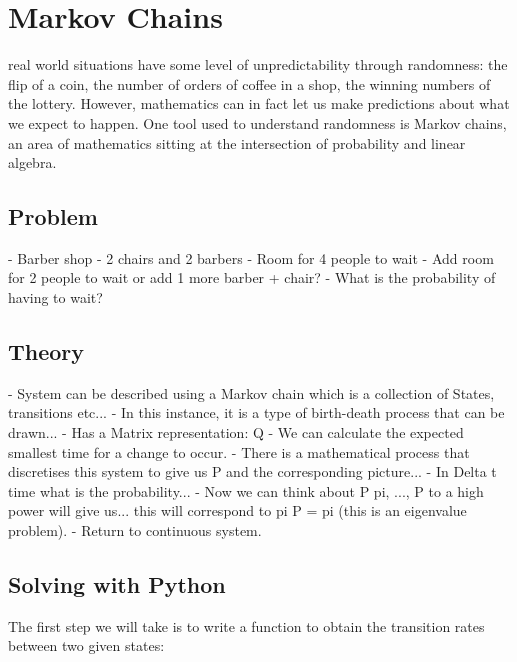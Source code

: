 \chapter[Markov Chains]{Markov Chains}

 real world situations have some level of
unpredictability through randomness: the flip of a coin, the number of orders of
coffee in a shop, the winning numbers of the lottery. However, mathematics can
in fact let us make predictions about what we expect to happen. One tool used to
understand randomness is Markov chains, an area of mathematics sitting at the
intersection of probability and linear algebra.

\section{Problem}\label{sec:problem}

- Barber shop
- 2 chairs and 2 barbers
- Room for 4 people to wait
- Add room for 2 people to wait or add 1 more barber + chair?
- What is the probability of having to wait?

\section{Theory}\label{sec:theory}

- System can be described using a Markov chain which is a collection of States,
transitions etc...
- In this instance, it is a type of birth-death process that can be drawn...
- Has a Matrix representation: Q
- We can calculate the expected smallest time for a change to occur.
- There is a mathematical process that discretises this system to give us P and
the corresponding picture...
- In Delta t time what is the probability...
- Now we can think about P pi, ..., P to a high power will give us...  this will
correspond to pi P = pi (this is an eigenvalue problem).
- Return to continuous system.

\section{Solving with Python}\label{sec:solving-with-python}

The first step we will take is to write a function to obtain the transition
rates between two given states:


